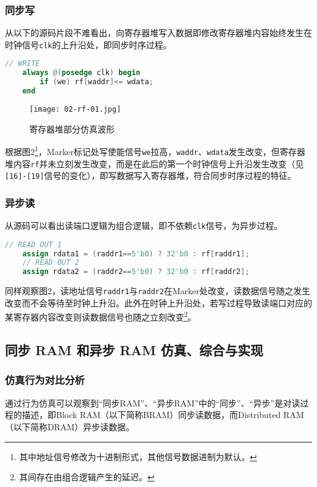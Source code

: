 \documentclass[UTF-8,twoside,c5size]{ctexart}
\begin{document}
	\subsubsection{同步写}
	从以下的源码片段不难看出，向寄存器堆写入数据即修改寄存器堆内容始终发生在时钟信号\texttt{clk}的上升沿处，即同步时序过程。
	\begin{lstlisting}[language=verilog]
	// WRITE
	always @(posedge clk) begin
		if (we) rf[waddr]<= wdata;
	end
	\end{lstlisting}

	\begin{figure}[!h]
		\centering
		\texttt{[image: 02-rf-01.jpg]}
		\caption{寄存器堆部分仿真波形}
	\end{figure}

	根据图2\footnote{其中地址信号修改为十进制形式，其他信号数据进制为默认。}，Marker标记处写使能信号\texttt{we}拉高，\texttt{waddr}、\texttt{wdata}发生改变，但寄存器堆内容\texttt{rf}并未立刻发生改变，而是在此后的第一个时钟信号上升沿发生改变（见\texttt{[16]-[19]}信号的变化），即写数据写入寄存器堆，符合同步时序过程的特征。

	\subsubsection{异步读}
	从源码可以看出读端口逻辑为组合逻辑，即不依赖\texttt{clk}信号，为异步过程。
	
	\begin{lstlisting}[language=Verilog]
	// READ OUT 1
	assign rdata1 = (raddr1==5'b0) ? 32'b0 : rf[raddr1];
	// READ OUT 2
	assign rdata2 = (raddr2==5'b0) ? 32'b0 : rf[raddr2];
	\end{lstlisting}

	同样观察图2，读地址信号\texttt{raddr1}与\texttt{raddr2}在Marker处改变，读数据信号随之发生改变而不会等待至时钟上升沿。此外在时钟上升沿处，若写过程导致读端口对应的某寄存器内容改变则读数据信号也随之立刻改变\footnote{其间存在由组合逻辑产生的延迟。}。
		
	\subsection{同步 RAM 和异步 RAM 仿真、综合与实现}
	\subsubsection{仿真行为对比分析}
	通过行为仿真可以观察到“同步RAM”、“异步RAM”中的“同步”、“异步”是对读过程的描述，即Block RAM（以下简称BRAM）同步读数据，而Distributed RAM（以下简称DRAM）异步读数据。
	
\end{document}

